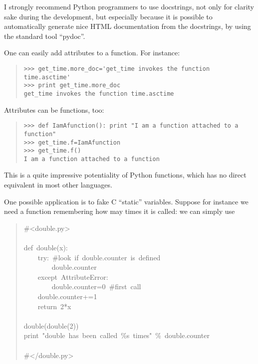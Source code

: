 \documentclass[10pt,english]{article}
\begin{document}
I strongly recommend Python programmers to use docstrings, not
only for clarity sake during the development, but especially because
it is possible to automatically generate nice HTML documentation from 
the docstrings, by using the standard tool ``pydoc''.

One can easily add attributes to a function. For instance:
\begin{quote}
\begin{verbatim}>>> get_time.more_doc='get_time invokes the function time.asctime'
>>> print get_time.more_doc
get_time invokes the function time.asctime\end{verbatim}
\end{quote}

Attributes can be functions, too:
\begin{quote}
\begin{verbatim}>>> def IamAfunction(): print "I am a function attached to a function"
>>> get_time.f=IamAfunction
>>> get_time.f()
I am a function attached to a function\end{verbatim}
\end{quote}

This is a quite impressive potentiality of Python functions, which has
no direct equivalent in most other languages.

One possible application is to fake C ``static'' variables. Suppose
for instance we need a function remembering how may times it is
called: we can simply use
\begin{quote}
\begin{ttfamily}\begin{flushleft}
\mbox{{\#}<double.py>}\\
\mbox{}\\
\mbox{def~double(x):}\\
\mbox{~~~~try:~{\#}look~if~double.counter~is~defined}\\
\mbox{~~~~~~~~double.counter}\\
\mbox{~~~~except~AttributeError:}\\
\mbox{~~~~~~~~double.counter=0~{\#}first~call}\\
\mbox{~~~~double.counter+=1}\\
\mbox{~~~~return~2*x}\\
\mbox{}\\
\mbox{double(double(2))}\\
\mbox{print~"double~has~been~called~{\%}s~times"~{\%}~double.counter}\\
\mbox{}\\
\mbox{{\#}</double.py>}
\end{flushleft}\end{ttfamily}
\end{quote}
\end{document}
